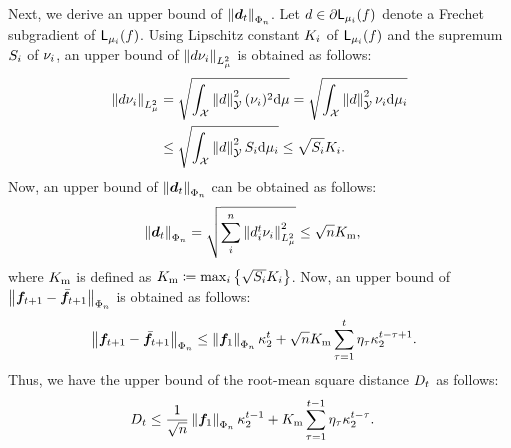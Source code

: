 \documentclass[journal]{IEEEtran}
\begin{document}
Next, we derive an upper bound of $\Dist{\bm{d}_{t}}_{\FedSpc}$.
Let $d \in \subDifLmui[f]$ denote a \gls{Frechet} subgradient of $\Lmui(f)$.
Using Lipschitz constant $\Lip{i}$ of $\Lmui(f)$ and the supremum $\maxRn$ of $\rn_i$,
an upper bound of $\Dist{d \rn_i}_{\LSpc}$ is obtained as follows:
\begin{align}
  \Dist{d \rn_i}_{\LSpc}
    &= \sqrt{\int_{\InSpc} \Dist{d}_{\OutSpc}^2 (\rn_i)^2 \dmu}
    = \sqrt{\int_{\InSpc} \Dist{d}_{\OutSpc}^2 \rn_i \dmui} \nonumber \\
    &\le \sqrt{\int_{\InSpc} \Dist{d}_{\OutSpc}^2 \maxRn \dmui}
    \le \sqrt{\maxRn} \Lip{i}. \label{eq:bound_dq}
\end{align}
Now, an upper bound of $\Dist{\bm{d}_{t}}_{\FedSpc}$ can be obtained as follows:
\begin{align}
  \Dist{\bm{d}_{t}}_{\FedSpc}
    &= \sqrt{\sum_i^{\NumU} \Dist{d_i^t \rn_i}_{\LSpc}^2}
    \le \sqrt{\NumU} \maxLip,
\end{align}
where $\maxLip$ is defined as $\maxLip\coloneqq \max_{i} \left\{\sqrt{\maxRn} \Lip{i}\right\}$.
Now, an upper bound of $\Dist{\bm{f}_{t+1} - \FedMeanF_{t+1}}_{\FedSpc}$ is obtained as follows:
\begin{align}
  &\Dist{\bm{f}_{t+1} - \FedMeanF_{t+1}}_{\FedSpc}
      \le \initF \convRate^t + \sqrt{\NumU} \maxLip \sum_{\tau=1}^{t} \lr_\tau \convRate^{t-\tau+1}.
\end{align}
Thus, we have the upper bound of the root-mean square distance $\MeanDist_t$ as follows:
\begin{align}
  \MeanDist_t
    &\le \frac{1}{\sqrt{n}} \initF \convRate^{t-1} + \maxLip\sum_{\tau=1}^{t-1} \lr_{\tau} \convRate^{t-\tau}.
\end{align}
\end{document}
